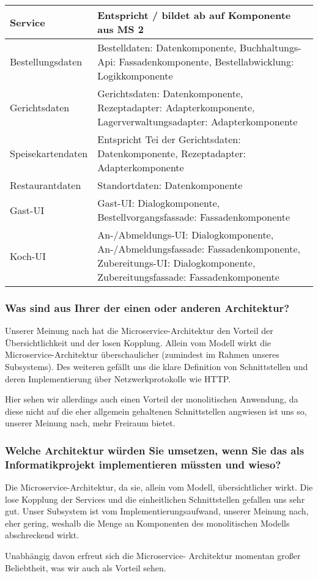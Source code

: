 \begin{tabu} to 
\hline{}
Service &Entspricht / bildet ab auf Komponente aus MS 2 \\
\hline
Bestellungsdaten &Bestelldaten: Datenkomponente,
  Buchhaltungs-Api: Fassadenkomponente,
  Bestellabwicklung: Logikkomponente
  \\
\hline
Gerichtsdaten &Gerichtsdaten: Datenkomponente,
  Rezeptadapter: Adapterkomponente,
  Lagerverwaltungsadapter: Adapterkomponente
  \\
\hline
Speisekartendaten &Entspricht Tei der Gerichtsdaten:
  Datenkomponente, Rezeptadapter: Adapterkomponente \\
\hline
Restaurantdaten &Standortdaten: Datenkomponente \\
\hline
Gast-UI &Gast-UI: Dialogkomponente,
  Bestellvorgangsfassade: Fassadenkomponente \\
\hline
Koch-UI &An-/Abmeldungs-UI: Dialogkomponente,
  An-/Abmeldungsfassade: Fassadenkomponente,
  Zubereitungs-UI: Dialogkomponente,
  Zubereitungsfassade: Fassadenkomponente
  \\
\hline
\end{tabu}

\subsubsection*{Was sind aus Ihrer der einen oder anderen
  Architektur?}

Unserer Meinung nach hat die Microservice-Architektur den
Vorteil der \"Ubersichtlichkeit und der losen Kopplung.
Allein vom Modell wirkt die Microservice-Architektur
\"uberschaulicher (zumindest im Rahmen unseres Subsystems).
Des weiteren gef\"allt uns die klare Definition von
Schnittstellen und deren Implementierung \"uber
Netzwerkprotokolle wie HTTP.

Hier sehen wir allerdings auch einen Vorteil der
monolitischen Anwendung, da diese nicht auf die eher
allgemein gehaltenen Schnittstellen angwiesen ist uns so,
unserer Meinung nach, mehr Freiraum bietet.

\subsubsection*{Welche Architektur w\"urden Sie umsetzen,
  wenn Sie das als Informatikprojekt implementieren
  m\"ussten und wieso?}

Die Microservice-Architektur, da sie, allein vom Modell,
\"ubersichtlicher wirkt. Die lose Kopplung der Services und
die einheitlichen Schnittstellen gefallen uns sehr gut.
Unser Subsystem ist vom Implementierungsaufwand, unserer
Meinung nach, eher gering, weshalb die Menge an Komponenten
des monolitischen Modells abschreckend wirkt.

Unabh\"angig davon erfreut sich die Microservice-
Architektur momentan gro{\ss}er Beliebtheit, was wir auch
als Vorteil sehen.
